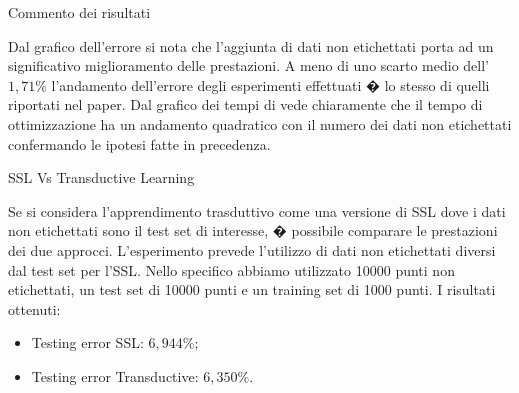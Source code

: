 \documentclass[mathserif]{beamer}
\begin{document}
\begin{frame}
\end{frame}

\begin{frame}
\end{frame}


\begin{frame}{Commento dei risultati}
\begin{block}{}
Dal grafico dell'errore si nota che l'\alert{aggiunta di dati non etichettati porta ad un significativo miglioramento delle prestazioni}. A meno di uno scarto medio dell' $1,71\%$ l'andamento dell'errore degli esperimenti effettuati � lo stesso di quelli riportati nel paper. Dal grafico dei tempi di vede chiaramente che il tempo di ottimizzazione ha un andamento \alert{quadratico} con il numero dei dati non etichettati confermando le ipotesi fatte in precedenza.
\end{block}
\end{frame}

\begin{frame}{SSL Vs Transductive Learning}
\begin{block}{}
Se si considera l'apprendimento trasduttivo come una versione di SSL dove i dati non etichettati sono il test set di interesse, � possibile comparare le prestazioni dei due approcci. L'esperimento prevede l'utilizzo di dati non etichettati diversi dal test set per l'SSL. Nello specifico abbiamo utilizzato 10000 punti non etichettati, un test set di 10000 punti e un training set di 1000 punti. I risultati ottenuti:
\begin{itemize}
	\item<1-> Testing error SSL: \alert{$6,944 \%$};
	\item<1-> Testing error Transductive: \alert{$6,350 \%$}.
\end{itemize}
\end{block}
\end{frame}
\end{document}
